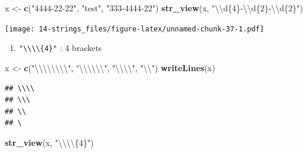 \documentclass[]{book}
\newenvironment{Shaded}{\begin{snugshade}}{\end{snugshade}}
\newcommand{\CharTok}[1]{\textcolor[rgb]{0.31,0.60,0.02}{#1}}
\newcommand{\KeywordTok}[1]{\textcolor[rgb]{0.13,0.29,0.53}{\textbf{#1}}}
\newcommand{\NormalTok}[1]{#1}
\newcommand{\StringTok}[1]{\textcolor[rgb]{0.31,0.60,0.02}{#1}}
\providecommand{\tightlist}{%
  \setlength{\itemsep}{0pt}\setlength{\parskip}{0pt}}
\theoremstyle{definition}
\theoremstyle{definition}
\theoremstyle{definition}
\theoremstyle{remark}
\begin{document}
\begin{enumerate}
\begin{Shaded}
\begin{Highlighting}[]
\NormalTok{x <-}\StringTok{ }\KeywordTok{c}\NormalTok{(}\StringTok{"4444-22-22"}\NormalTok{, }\StringTok{"test"}\NormalTok{, }\StringTok{"333-4444-22"}\NormalTok{)}
\KeywordTok{str_view}\NormalTok{(x, }\StringTok{"}\CharTok{\textbackslash{}\textbackslash{}}\StringTok{d\{4\}-}\CharTok{\textbackslash{}\textbackslash{}}\StringTok{d\{2\}-}\CharTok{\textbackslash{}\textbackslash{}}\StringTok{d\{2\}"}\NormalTok{)}
\end{Highlighting}
\end{Shaded}

  \texttt{[image: 14-strings\_files/figure-latex/unnamed-chunk-37-1.pdf]}

  \begin{enumerate}
  \def\labelenumii{\arabic{enumii}.}
  \setcounter{enumii}{3}
  \tightlist
  \item
    \texttt{"\textbackslash{}\textbackslash{}\textbackslash{}\textbackslash{}\{4\}"}
    : 4 brackets
  \end{enumerate}

\begin{Shaded}
\begin{Highlighting}[]
\NormalTok{x <-}\StringTok{ }\KeywordTok{c}\NormalTok{(}\StringTok{"}\CharTok{\textbackslash{}\textbackslash{}\textbackslash{}\textbackslash{}\textbackslash{}\textbackslash{}\textbackslash{}\textbackslash{}}\StringTok{"}\NormalTok{, }\StringTok{"}\CharTok{\textbackslash{}\textbackslash{}\textbackslash{}\textbackslash{}\textbackslash{}\textbackslash{}}\StringTok{"}\NormalTok{, }\StringTok{"}\CharTok{\textbackslash{}\textbackslash{}\textbackslash{}\textbackslash{}}\StringTok{"}\NormalTok{, }\StringTok{"}\CharTok{\textbackslash{}\textbackslash{}}\StringTok{"}\NormalTok{)}
\KeywordTok{writeLines}\NormalTok{(x)}
\end{Highlighting}
\end{Shaded}

\begin{verbatim}
## \\\\
## \\\
## \\
## \
\end{verbatim}

\begin{Shaded}
\begin{Highlighting}[]
\KeywordTok{str_view}\NormalTok{(x, }\StringTok{"}\CharTok{\textbackslash{}\textbackslash{}\textbackslash{}\textbackslash{}}\StringTok{\{4\}"}\NormalTok{)}
\end{Highlighting}
\end{Shaded}


\end{enumerate}
\end{document}
